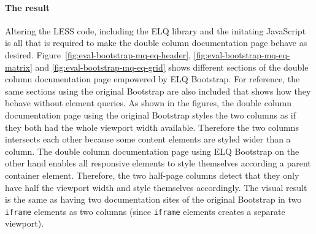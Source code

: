 \documentclass[a4paper,11pt]{kth-mag}
\newcommand{\code}[1]{\texttt{#1}}
\begin{document}
      \paragraph{The result}
      Altering the \gls{LESS} code, including the \gls{ELQ} library and the initating JavaScript is all that is required to make the double column documentation page behave as desired.
      Figure~\ref{fig:eval-bootstrap-mq-eq-header}, \ref{fig:eval-bootstrap-mq-eq-matrix} and \ref{fig:eval-bootstrap-mq-eq-grid} shows different sections of the double column documentation page empowered by \gls{ELQ} Bootstrap.
      For reference, the same sections using the original Bootstrap are also included that shows how they behave without element queries.
      As shown in the figures, the double column documentation page using the original Bootstrap styles the two columns as if they both had the whole viewport width available.
      Therefore the two columns intersects each other because some content elements are styled wider than a column.
      The double column documentation page using \gls{ELQ} Bootstrap on the other hand enables all responsive elements to style themselves according a parent container element.
      Therefore, the two half-page columns detect that they only have half the viewport width and style themselves accordingly.
      The visual result is the same as having two documentation sites of the original Bootstrap in two \code{iframe} elements as two columns (since \code{iframe} elements creates a separate viewport).
\end{document}
